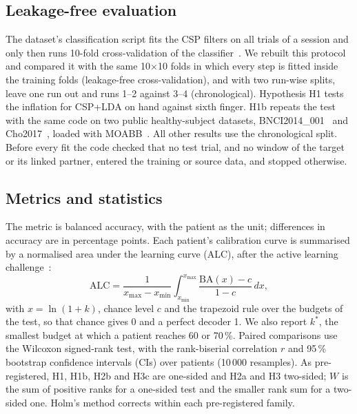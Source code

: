 \subsection{Leakage-free evaluation}
The dataset's classification script fits the CSP filters on all trials of a
session and only then runs 10-fold cross-validation of the
classifier~\cite{wang2026dataset}. We rebuilt this protocol and compared it
with the same 10$\times$10 folds in which every step is fitted inside the
training folds (leakage-free cross-validation), and with two run-wise splits,
leave one run out and runs 1--2 against 3--4 (chronological). Hypothesis H1
tests the inflation for CSP+LDA on hand against sixth finger. H1b repeats the
test with the same code on two public healthy-subject datasets,
BNCI2014\_001~\cite{tangermann2012} and Cho2017~\cite{cho2017}, loaded with
MOABB~\cite{jayaram2018moabb}. All other results use the chronological split.
Before every fit the code checked that no test trial, and no window of the
target or its linked partner, entered the training or source data, and
stopped otherwise.

\subsection{Metrics and statistics}
The metric is balanced accuracy, with the patient as the unit; differences in
accuracy are in percentage points. Each patient's calibration curve is
summarised by a normalised area under the learning curve (ALC), after the
active learning challenge~\cite{guyon2011}:
\begin{equation}
\mathrm{ALC} = \frac{1}{x_{\max} - x_{\min}} \int_{x_{\min}}^{x_{\max}}
\frac{\mathrm{BA}(x) - c}{1 - c}\, dx,
\end{equation}
with $x = \ln(1 + k)$, chance level $c$ and the trapezoid rule over the
budgets of the test, so that chance gives 0 and a perfect decoder 1. We also report $k^*$, the
smallest budget at which a patient reaches 60 or 70\,\%. Paired comparisons
use the Wilcoxon signed-rank test, with the rank-biserial correlation $r$ and
95\,\% bootstrap confidence intervals (CIs) over patients (10\,000
resamples). As pre-registered, H1, H1b, H2b and H3c are one-sided and H2a and
H3 two-sided; $W$ is the sum of positive ranks for a one-sided test and the
smaller rank sum for a two-sided one. Holm's method corrects within each
pre-registered family.

